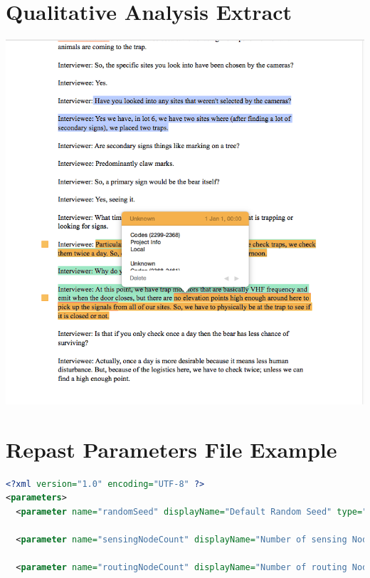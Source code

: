 \begin{appendices}
\chapter{Qualitative Analysis Extract}\label{appendix:interview:extract}
\includegraphics[width=\textwidth]{App/figures/roshan_extract}

\chapter{Repast Parameters File Example}\label{appendix:sims:params}
\begin{lstlisting}[language=XML, caption={Example params.xml file for a Repast simulation}]
<?xml version="1.0" encoding="UTF-8" ?>
<parameters>
  <parameter name="randomSeed" displayName="Default Random Seed" type="int" defaultValue="__NULL__" />
  
  <parameter name="sensingNodeCount" displayName="Number of sensing Nodes" type="int" defaultValue="20" isReadOnly="false" converter="repast.simphony.parameter.StringConverterFactory$IntConverter"  />

  <parameter name="routingNodeCount" displayName="Number of routing Nodes" type="int" defaultValue="4" isReadOnly="false" converter="repast.simphony.parameter.StringConverterFactory$IntConverter" />
  

\end{lstlisting}
\end{appendices}
